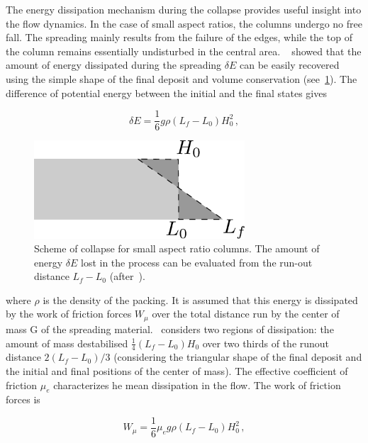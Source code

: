 The energy dissipation mechanism during the collapse provides useful insight 
into the flow dynamics. In the case of small aspect ratios, the columns undergo 
no free fall. The spreading mainly results from the failure of the edges, while 
the top of the column remains essentially undisturbed in the central area. 
~\citet{Staron2006a} showed that the amount of energy dissipated during the 
spreading $\delta E$ can be easily recovered using the simple shape of the 
final deposit and volume conservation (see~\cref{fig:volume_conservation}). The 
difference of potential energy between the initial and the final states gives

\begin{equation}
\delta E = \frac{1}{6} g \rho (L_f - L_0) H_0^2 \,,
\end{equation}

\begin{figure}
\centering
\includegraphics[width=0.7\textwidth]{volume_conservation}
\caption{Scheme of collapse for small aspect ratio columns. The amount of 
energy $\delta E$ lost in the process can be evaluated
from the run-out distance $L_f - L_0$ (after~\citet{Staron2006a}).}
\label{fig:volume_conservation}
\end{figure}

where $\rho$ is the density of the packing. It is assumed that this energy is 
dissipated by the work of friction forces $W_{\mu}$ over the total distance run 
by the center of mass G of the spreading material.~\citet{Staron2006} considers 
two regions of dissipation: the amount of mass destabilised $\frac{1}{4}(L_f - 
L_0) H_0$ over two thirds of the runout distance $2(L_f - L_0) / 3$ (considering
the triangular shape of the final deposit and the initial and final positions 
of the center of mass). The effective coefficient of friction $\mu_e$ 
characterizes he mean dissipation in the flow. The work of friction forces is 

\begin{equation}
W_{\mu} = \frac{1}{6} \mu_e g \rho (L_f - L_0) H_0^2 \,,
\end{equation}


